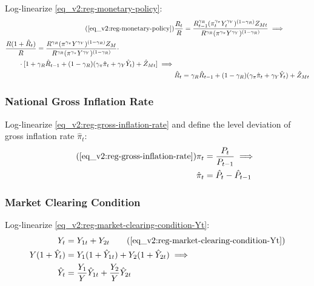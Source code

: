 \documentclass[../thesis.tex]{subfiles}
\begin{document}
Log-linearize \ref{eq_v2:reg-monetary-policy}:
\begin{align}
	\tag{\ref{eq_v2:reg-monetary-policy}}
	& \frac{R_{t}}{R} = \frac{R_{t-1}^{\gamma_R} (\pi_t^{\gamma_\pi} Y_{t}^{\gamma_Y})^{(1-\gamma_R)} Z_{Mt}}{R^{\gamma_R} (\pi^{\gamma_\pi} Y^{\gamma_Y})^{(1-\gamma_R)}} \implies \\
	\begin{split}
		& \frac{R(1+ \hat{R}_t)}{R} = \frac{ R^{\gamma_R} (\pi^{\gamma_\pi} Y^{\gamma_Y})^{(1-\gamma_R)} Z_{M}}{R^{\gamma_R} (\pi^{\gamma_\pi} Y^{\gamma_Y})^{(1-\gamma_R)}} \cdot \\
		& \qquad \cdot [1+ \gamma_R \hat{R}_{t-1} + (1-\gamma_R)(\gamma_\pi \hat{\pi}_t + \gamma_Y \hat{Y}_t) + \hat{Z}_{Mt}] \implies
	\end{split} \nonumber \\
	& \hat{R}_t = \gamma_R \hat{R}_{t-1} + (1-\gamma_R)(\gamma_\pi \hat{\pi}_t + \gamma_Y \hat{Y}_t) + \hat{Z}_{Mt} \label{eq_v2:reg-ll-monetary-policy}
\end{align}


\subsubsection*{National Gross Inflation Rate}

Log-linearize \ref{eq_v2:reg-gross-inflation-rate} and define the level deviation of gross inflation rate $\hat{\pi}_t$:
\begin{align}
	\tag{\ref{eq_v2:reg-gross-inflation-rate}}
	\pi_{t} &= \frac{P_{t}}{P_{t-1}} \implies \\
	\hat{\pi}_{t} &= \hat{P}_{t} - \hat{P}_{t-1}
	\label{eq_v2:reg-level-dev-gross-inflation-rate}
\end{align}


\subsubsection*{Market Clearing Condition}

Log-linearize \ref{eq_v2:reg-market-clearing-condition-Yt}:
\begin{alignat}{2}
	Y_{t} &= Y_{1 t} + Y_{2 t} \tag{\ref{eq_v2:reg-market-clearing-condition-Yt}} \\
	Y (1 +\hat{Y}_{t}) &= Y_{1} (1 +\hat{Y}_{1t}) + Y_{2} (1 +\hat{Y}_{2t}) \implies \nonumber \\
	\hat{Y}_{t} &= \frac{Y_{1}}{Y} \hat{Y}_{1t} + \frac{Y_{2}}{Y} \hat{Y}_{2t} \label{eq_v2:reg-ll-market-clearing-condition-Yt-2}
\end{alignat}
\end{document}

